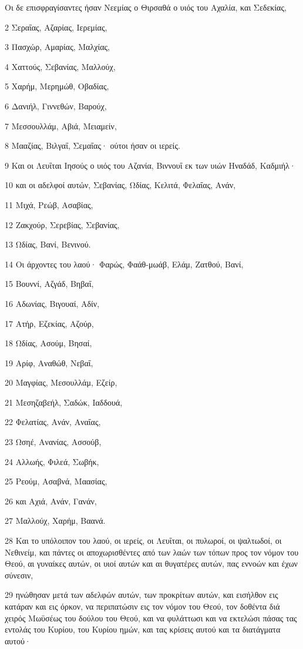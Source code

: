 \par Οι δε επισφραγίσαντες ήσαν Νεεμίας ο Θιρσαθά ο υιός του Αχαλία, και Σεδεκίας,
\par 2 Σεραΐας, Αζαρίας, Ιερεμίας,
\par 3 Πασχώρ, Αμαρίας, Μαλχίας,
\par 4 Χαττούς, Σεβανίας, Μαλλούχ,
\par 5 Χαρήμ, Μερημώθ, Οβαδίας,
\par 6 Δανιήλ, Γιννεθών, Βαρούχ,
\par 7 Μεσσουλλάμ, Αβιά, Μειαμείν,
\par 8 Μααζίας, Βιλγαΐ, Σεμαΐας· ούτοι ήσαν οι ιερείς.
\par 9 Και οι Λευΐται Ιησούς ο υιός του Αζανία, Βιννουΐ εκ των υιών Ηναδάδ, Καδμιήλ·
\par 10 και οι αδελφοί αυτών, Σεβανίας, Ωδίας, Κελιτά, Φελαΐας, Ανάν,
\par 11 Μιχά, Ρεώβ, Ασαβίας,
\par 12 Ζακχούρ, Σερεβίας, Σεβανίας,
\par 13 Ωδίας, Βανί, Βενινού.
\par 14 Οι άρχοντες του λαού· Φαρώς, Φαάθ-μωάβ, Ελάμ, Ζατθού, Βανί,
\par 15 Βουννί, Αζγάδ, Βηβαΐ,
\par 16 Αδωνίας, Βιγουαί, Αδίν,
\par 17 Ατήρ, Εζεκίας, Αζούρ,
\par 18 Ωδίας, Ασούμ, Βησαί,
\par 19 Αρίφ, Αναθώθ, Νεβαΐ,
\par 20 Μαγφίας, Μεσουλλάμ, Εζείρ,
\par 21 Μεσηζαβεήλ, Σαδώκ, Ιαδδουά,
\par 22 Φελατίας, Ανάν, Αναΐας,
\par 23 Ωσηέ, Ανανίας, Ασσούβ,
\par 24 Αλλωής, Φιλεά, Σωβήκ,
\par 25 Ρεούμ, Ασαβνά, Μαασίας,
\par 26 και Αχιά, Ανάν, Γανάν,
\par 27 Μαλλούχ, Χαρήμ, Βαανά.
\par 28 Και το υπόλοιπον του λαού, οι ιερείς, οι Λευΐται, οι πυλωροί, οι ψαλτωδοί, οι Νεθινείμ, και πάντες οι αποχωρισθέντες από των λαών των τόπων προς τον νόμον του Θεού, αι γυναίκες αυτών, οι υιοί αυτών και αι θυγατέρες αυτών, πας εννοών και έχων σύνεσιν,
\par 29 ηνώθησαν μετά των αδελφών αυτών, των προκρίτων αυτών, και εισήλθον εις κατάραν και εις όρκον, να περιπατώσιν εις τον νόμον του Θεού, τον δοθέντα διά χειρός Μωϋσέως του δούλου του Θεού, και να φυλάττωσι και να εκτελώσι πάσας τας εντολάς του Κυρίου, του Κυρίου ημών, και τας κρίσεις αυτού και τα διατάγματα αυτού·
